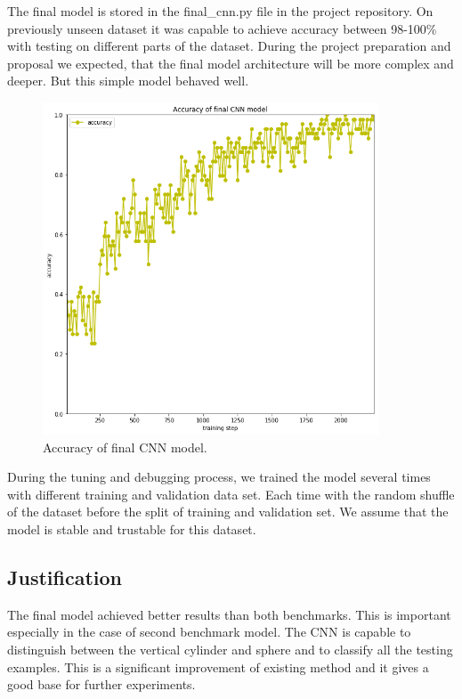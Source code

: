 \documentclass{article}
\begin{document}
The final model is stored in the final\_cnn.py file in the project
repository. On previously unseen dataset it was capable to achieve
accuracy between 98-100\% with testing on different parts of the
dataset. During the project preparation and proposal we expected, that
the final model architecture will be more complex and deeper. But this
simple model behaved well.

\begin{figure}[!htp]
\centerline{\includegraphics[width=10cm]{img/final_model_accuracy.png}}
\renewcommand{\figurename}{Figure}
\caption[Accuracy of final CNN model.]{Accuracy of final CNN model.}
\label{fig:FinalModelAccuracy}
\end{figure}


During the tuning and debugging process, we trained the model several
times with different training and validation data set. Each time with
the random shuffle of the dataset before the split of training and
validation set. We assume that the model is stable and trustable for
this dataset.

\subsection{Justification}\label{justification}

The final model achieved better results than both benchmarks. This is
important especially in the case of second benchmark model. The CNN is
capable to distinguish between the vertical cylinder and sphere and to
classify all the testing examples. This is a significant improvement of
existing method and it gives a good base for further experiments.
\end{document}
